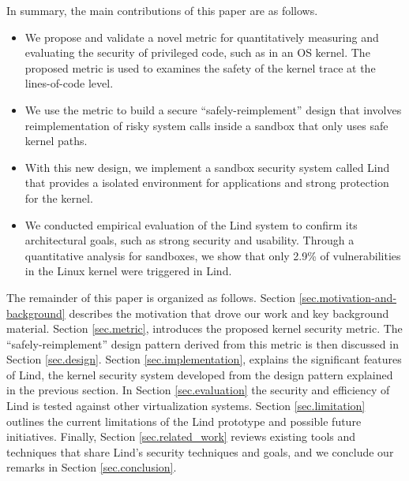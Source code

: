 In summary,
the main contributions of this paper are as follows. %
\begin{itemize}
\item
We propose and validate a novel metric for quantitatively measuring and
evaluating the security of privileged code, such as in an OS kernel.
The proposed metric is used to examines the safety of the kernel trace at the lines-of-code level.


\item
We use the metric to build a secure ``safely-reimplement'' design that
involves reimplementation of risky system calls inside a
sandbox that only uses safe kernel paths.

\item
With this new design, we implement a sandbox security system called Lind
that provides a isolated environment for applications and strong protection for the kernel.

\item
We conducted empirical evaluation of the Lind system to confirm its architectural
 goals, such as strong security and usability.
Through a quantitative analysis for sandboxes, we show that only 2.9\% of
vulnerabilities in the Linux kernel were triggered in Lind.


\end{itemize}

The remainder of this paper is organized as follows.
Section \ref{sec.motivation-and-background} describes the motivation that drove our work and key background material.
Section \ref{sec.metric}, introduces the proposed kernel security metric. The
``safely-reimplement'' design pattern derived from this metric is then discussed in Section \ref{sec.design}. Section \ref{sec.implementation},
explains the significant features of Lind, the kernel security system developed
from the design pattern explained in the previous section. In Section \ref{sec.evaluation} the security and
efficiency of Lind is tested against other virtualization systems.
Section \ref{sec.limitation} outlines the current
limitations of the Lind prototype and possible future initiatives.
Finally, Section \ref{sec.related_work} reviews existing tools and techniques that share
Lind's security techniques and goals, and we conclude our remarks in
Section \ref{sec.conclusion}.
